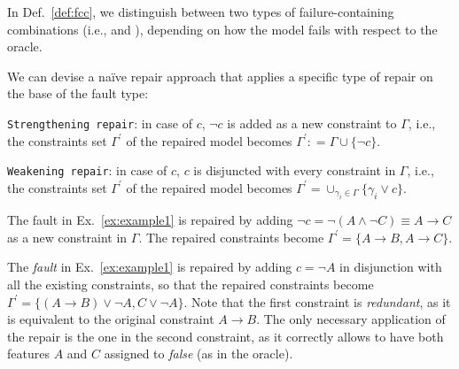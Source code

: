 \begin{tikzborder}{\cite{Gargantini16:validation}}
\begin{tikzborder}{\cite{gargantini_combinatorial_2017}}
\begin{tikzborder}{\cite{gargantini_combinatorial_2017}}
\begin{tikzborder}{\cite{garn2019}}
\begin{tikzborder}{\cite{arcaini2019achieving}}
\begin{tikzborder}{\cite{arcaini2019varivolution}}
		\bb
		In Def.~\ref{def:fcc}, we distinguish between two types of failure-containing combinations (i.e., \underConstr and \overConstr \fcc), depending on how the model fails with respect to the oracle.
		
		We can devise a na{\"i}ve repair approach that applies a specific type of repair on the base of the fault type:
		\begin{compactenum}
			\item {\tt Strengthening repair}: in case of \underConstr \fcc $c$, $\neg c$ is added as a new constraint to $\Gamma$, i.e., the constraints set $\Gamma^\prime$ of the repaired model becomes $\Gamma^\prime: = \Gamma \cup \{\neg c\}$.
			\item {\tt Weakening repair}: in case of \overConstr \fcc $c$, $c$ is disjuncted with every constraint in $\Gamma$, i.e., the constraints set $\Gamma^\prime$ of the repaired model becomes $\Gamma^\prime = \cup_{\gamma_i \in \Gamma}\{ \gamma_i \vee c\}$.
		\end{compactenum}
		
		
		\begin{exmp}\label{ex:example_rep1}
			The \textit{\underConstr} fault in Ex.~\ref{ex:example1} is repaired by adding $\neg c = \neg(A\wedge\neg C) \equiv A \rightarrow C$ as a new constraint in $\Gamma$. The repaired constraints become $\Gamma^\prime = \{A\rightarrow B, A\rightarrow C\}$.
		\end{exmp}
		
		
		\begin{exmp}\label{ex:example_rep2}
			The \textit{\overConstr fault} in Ex.~\ref{ex:example1} is repaired by adding $c = \neg A$ in disjunction with all the existing constraints, so that the repaired constraints become $\Gamma^\prime = \{(A \rightarrow B) \vee \neg A, C \vee\neg A\}$. Note that the first constraint is {\it redundant}, as it is equivalent to the original constraint $A \rightarrow B$. The only necessary application of the repair is the one in the second constraint, as it correctly allows to have both features $A$ and $C$ assigned to {\it false} (as in the oracle).
		\end{exmp}
		
		
		

\end{tikzborder}
\end{tikzborder}
\end{tikzborder}
\end{tikzborder}
\end{tikzborder}
\end{tikzborder}
